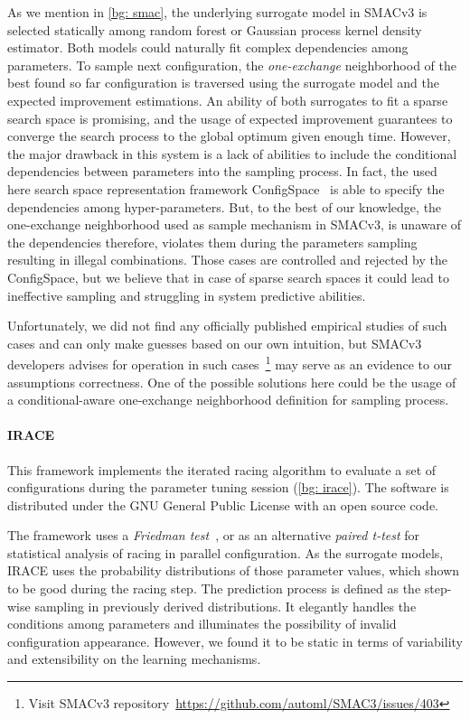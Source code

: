 As we mention in \cref{bg: smac}, the underlying surrogate model in SMACv3 is selected statically among random forest or Gaussian process kernel density estimator. Both models could naturally fit complex dependencies among parameters. To sample next configuration, the \emph{one-exchange} neighborhood of the best found so far configuration is traversed using the surrogate model and the expected improvement estimations.
An ability of both surrogates to fit a sparse search space is promising, and the usage of expected improvement guarantees to converge the search process to the global optimum given enough time. However, the major drawback in this system is a lack of abilities to include the conditional dependencies between parameters into the sampling process. In fact, the used here search space representation framework ConfigSpace~\cite{configspace} is able to specify the dependencies among hyper-parameters. But, to the best of our knowledge, the one-exchange neighborhood used as sample mechanism in SMACv3, is unaware of the dependencies therefore, violates them during the parameters sampling resulting in illegal combinations. Those cases are controlled and rejected by the ConfigSpace, but we believe that in case of sparse search spaces it could lead to ineffective sampling and struggling in system predictive abilities. 

Unfortunately, we did not find any officially published empirical studies of such cases and can only make guesses based on our own intuition, but SMACv3 developers advises for operation in such cases~\footnote{Visit SMACv3 repository~\url{https://github.com/automl/SMAC3/issues/403}} may serve as an evidence to our assumptions correctness. One of the possible solutions here could be the usage of a conditional-aware one-exchange neighborhood definition for sampling process.


\paragraph{IRACE} This framework implements the iterated racing algorithm to evaluate a set of configurations during the parameter tuning session (\cref{bg: irace}). The software is distributed under the GNU General Public License with an open source code.

The framework uses a \emph{Friedman test}~\cite{conover1980practical}, or as an alternative \emph{paired t-test} for statistical analysis of racing in parallel configuration. As the surrogate models, IRACE uses the probability distributions of those parameter values, which shown to be good during the racing step. The prediction process is defined as the step-wise sampling in previously derived distributions. It elegantly handles the conditions among parameters and illuminates the possibility of invalid configuration appearance. However, we found it to be static in terms of variability and extensibility on the learning mechanisms.

